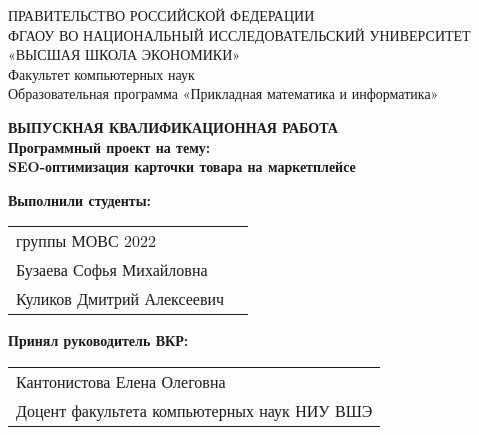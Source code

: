 \begin{titlepage}
\newpage

{
\begin{center}
ПРАВИТЕЛЬСТВО РОССИЙСКОЙ ФЕДЕРАЦИИ\\
ФГАОУ ВО НАЦИОНАЛЬНЫЙ ИССЛЕДОВАТЕЛЬСКИЙ УНИВЕРСИТЕТ\\
«ВЫСШАЯ ШКОЛА ЭКОНОМИКИ»
\\
\bigskip
Факультет компьютерных наук\\
Образовательная программа «Прикладная математика и информатика»
\end{center}
}

\vspace{7em}

\begin{center}
{\bf ВЫПУСКНАЯ КВАЛИФИКАЦИОННАЯ РАБОТА}\\
{\bf Программный проект на тему:}\\
{\bf SEO-оптимизация карточки товара на маркетплейсе}\\
\end{center}

\vspace{2em}

{\bf Выполнили студенты: \vspace{2mm}}

{
\begin{tabular}{l@{\hskip 1.5cm}l}
группы МОВС 2022 \\
Бузаева Софья Михайловна \\
Куликов Дмитрий Алексеевич
\end{tabular}}


\vspace{1em}
{\bf Принял руководитель ВКР: \vspace{2mm}}

{
\begin{tabular}{l}
Кантонистова Елена Олеговна\\
Доцент факультета компьютерных наук НИУ ВШЭ 
\end{tabular}}


\end{titlepage}

